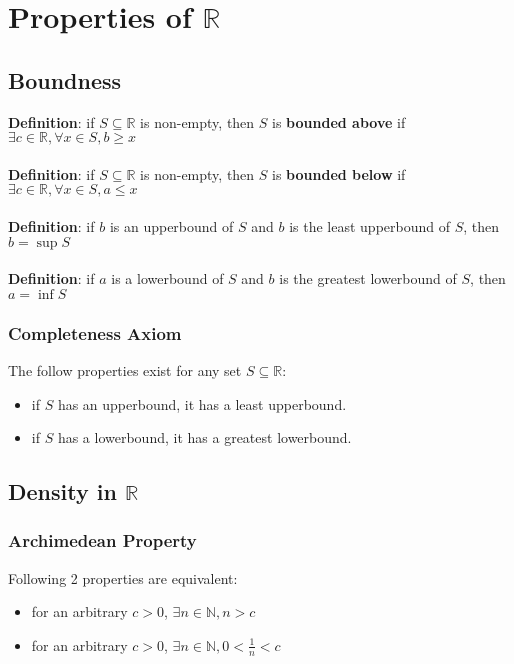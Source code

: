 \documentclass{article}
\begin{document}
  \section{Properties of $\mathbb{R}$}
  \subsection{Boundness}
  \textbf{Definition}: if $S \subseteq \mathbb{R}$ is non-empty, then $S$ is \textbf{bounded above} if $\exists c \in \mathbb{R}, \forall x \in S, b \geq x$ \\ \\
  \textbf{Definition}: if $S \subseteq \mathbb{R}$ is non-empty, then $S$ is \textbf{bounded below} if $\exists c \in \mathbb{R}, \forall x \in S, a \leq x$ \\ \\
  \textbf{Definition}: if $b$ is an upperbound of $S$ and $b$ is the least upperbound of $S$, then $b = \sup{S}$ \\ \\
  \textbf{Definition}: if $a$ is a lowerbound of $S$ and $b$ is the greatest lowerbound of $S$, then $a = \inf{S}$
  \subsubsection{Completeness Axiom}
  The follow properties exist for any set $S \subseteq \mathbb{R}$:
  \begin{itemize}
    \item if $S$ has an upperbound, it has a least upperbound.
    \item if $S$ has a lowerbound, it has a greatest lowerbound.
  \end{itemize}
  \subsection{Density in $\mathbb{R}$}
  \subsubsection{Archimedean Property}
  Following 2 properties are equivalent:
  \begin{itemize}
    \item for an arbitrary $c > 0$, $\exists n \in \mathbb{N}, n > c$ 
    \item for an arbitrary $c > 0$, $\exists n \in \mathbb{N}, 0 < \frac{1}{n} < c$
  \end{itemize}
\end{document}
